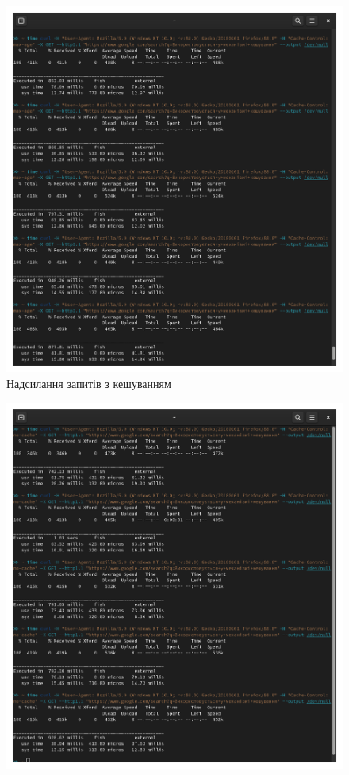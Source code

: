 \documentclass{article}
\begin{document}
\begin{normalsize}
\begin{figure}[H]
	\centering
	\includegraphics[width=\textwidth]{43}
	\caption{Надсилання запитів з кешуванням}
\end{figure}
\begin{figure}[H]
	\centering
	\includegraphics[width=\textwidth]{44}

\end{figure}
\end{normalsize}
\end{document}
